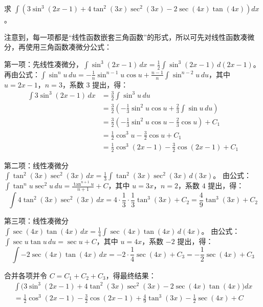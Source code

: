 \begin{myexample}
  求 $\int ( 3\sin^{3}(2x-1) + 4\tan^{2}(3x)\sec^{2}(3x) - 2\sec(4x)\tan(4x) ) dx$。

  注意到，每一项都是“线性函数嵌套三角函数”的形式，所以可先对线性函数凑微分，再使用三角函数凑微分公式：

第一项：先线性凑微分，$\int \sin^{3}(2x-1)\,dx = \frac{1}{2}\int \sin^{3}(2x-1)\,d(2x-1)$。
          再由公式：$\int \sin^{n} u\,du = -\frac{1}{n}\sin^{n-1}u\cos u + \frac{n-1}{n}\int \sin^{n-2}u\,du$，其中 $u=2x-1$，$n=3$，系数 $3$ 提出，得：
          \[
          \begin{aligned}
            \int 3\sin^{3}(2x-1)\,dx
            &= \frac{3}{2}\int \sin^{3}u\,du \\
            &= \frac{3}{2}( -\frac{1}{3}\sin^{2}u\cos u + \frac{2}{3}\int \sin u\,du ) \\
            &= \frac{3}{2}( -\frac{1}{3}\sin^{2}u\cos u - \frac{2}{3}\cos u ) + C_{1} \\
            &= \frac{1}{2}\cos^{3}u - \frac{3}{2}\cos u + C_{1} \\
            &= \frac{1}{2}\cos^{3}(2x-1) - \frac{3}{2}\cos(2x-1) + C_{1}
          \end{aligned}
          \]

第二项：线性凑微分 $\int \tan^{2}(3x)\sec^{2}(3x)\,dx = \frac{1}{3}\int \tan^{2}(3x)\sec^{2}(3x)\,d(3x)$。
          由公式：$\int \tan^{n} u \sec^{2} u\,du = \frac{\tan^{n+1}u}{n+1} + C$，其中 $u=3x$，$n=2$，系数 $4$ 提出，得：
          \[
          \int 4\tan^{2}(3x)\sec^{2}(3x)\,dx = 4\cdot\frac{1}{3}\cdot\frac{1}{3}\tan^{3}(3x) + C_{2}
          = \frac{4}{9}\tan^{3}(3x) + C_{2}
          \]

第三项：线性凑微分 $\int \sec(4x)\tan(4x)\,dx = \frac{1}{4}\int \sec(4x)\tan(4x)\,d(4x)$。
          由公式：$\int \sec u \tan u\,du = \sec u + C$，其中 $u=4x$，系数 $-2$ 提出，得：
          \[
          \int -2\sec(4x)\tan(4x)\,dx = -2\cdot\frac{1}{4}\sec(4x) + C_{3} = -\frac{1}{2}\sec(4x) + C_{3}
          \]

合并各项并令 $C = C_{1}+C_{2}+C_{3}$，得最终结果：
\[
\begin{aligned}
\int \bigl( 3\sin^{3}(2x-1) + 4\tan^{2}(3x)\sec^{2}(3x) - 2\sec(4x)\tan(4x) \bigr) dx \\
= \frac{1}{2}\cos^{3}(2x-1) - \frac{3}{2}\cos(2x-1) + \frac{4}{9}\tan^{3}(3x) - \frac{1}{2}\sec(4x) + C
\end{aligned}
\]
\end{myexample}


